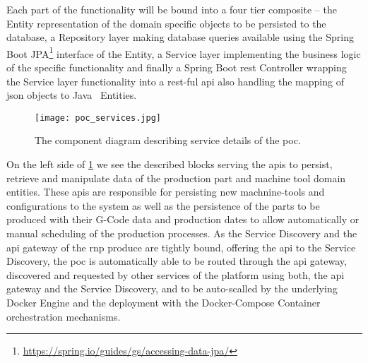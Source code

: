\documentclass[
a4paper,
twoside,
headsepline,
cleardoublepage=empty,
parskip=half,
draft=false
]{scrbook}
\begin{document}
				Each part of the functionality will be bound into a four tier composite -- the Entity representation of the domain specific objects to be persisted to the database, a Repository layer making database queries available using the Spring Boot JPA\footnote{\url{https://spring.io/guides/gs/accessing-data-jpa/}} interface of the Entity, a Service layer implementing the business logic of the specific functionality and finally a Spring Boot \gls{rest} Controller wrapping the Service layer functionality into a \gls{rest}-ful \gls{api} also handling the mapping of \gls{json} objects to Java~\cite{java2015} Entities.

				\begin{figure}[htbp]
					\centering
					\texttt{[image: poc\_services.jpg]}
					\caption{The component diagram describing service details of the \gls{poc}.}
					\label{fig:poc_service_diagram}
				\end{figure}

				On the left side of \cref{fig:poc_service_diagram} we see the described blocks serving the \gls{api}s to persist, retrieve and manipulate data of the production part and machine tool domain entities. These \gls{api}s are responsible for persisting new machnine-tools and configurations to the system as well as the persistence of the parts to be produced with their G-Code data and production dates to allow automatically or manual scheduling of the production processes. As the Service Discovery and the \gls{api} gateway of the \gls{rnp} produce are tightly bound, offering the \gls{api} to the Service Discovery, the \gls{poc} is automatically able to be routed through the \gls{api} gateway, discovered and requested by other services of the platform using both, the \gls{api} gateway and the Service Discovery, and to be auto-scalled by the underlying Docker Engine and the deployment with the Docker-Compose Container orchestration mechanisms.
\end{document}
